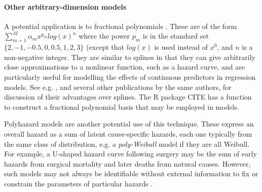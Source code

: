 \documentclass[nojss,nofooter]{jss}
\begin{document}
\paragraph{Other arbitrary-dimension models}

A potential application is to fractional polynomials
\citep{royston1994regression}. These are of the form $\sum_{m=1}^M
\alpha_m x^{p_m} log(x)^n$ where the power $p_m$ is in the standard
set $\{2,-1,-0.5,0,0.5,1,2,3\}$ (except that $log(x)$ is used instead
of $x^0$, and $n$ is a non-negative integer. They are similar to
splines in that they can give arbitrarily close approximations to a
nonlinear function, such as a hazard curve, and are particularly
useful for modelling the effects of continuous predictors in
regression models.  See e.g. \citet{sauerbrei2007selection}, and
several other publications by the same authors, for discussion of
their advantages over splines.  The R package  CITE has a
function to construct a fractional polynomial basis that may be
employed in  models.

Polyhazard models \citep{polyhazard} are another potential use of this
technique.  These express an overall hazard as a sum of latent
cause-specific hazards, each one typically from the same class of
distribution, e.g. a \emph{poly-Weibull} model if they are all
Weibull.  For example, a U-shaped hazard curve following surgery may
be the sum of early hazards from surgical mortality and later deaths
from natural causes.  However, such models may not always be
identifiable without external information to fix or constrain the
parameters of particular hazards \citep{demiris2011survival}.
\end{document}

